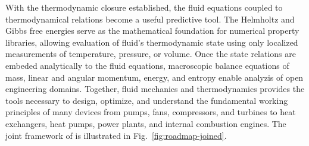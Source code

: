 With the thermodynamic closure established, the fluid equations coupled to thermodynamical relations become a useful predictive tool. The Helmholtz and Gibbs free energies serve as the mathematical foundation for numerical property libraries, allowing evaluation of fluid's thermodynamic state using only localized measurements of temperature, pressure, or volume. Once the state relations are embeded analytically to the fluid equations, macroscopic balance equations of mass, linear and angular momentum, energy, and entropy enable analyzis of open engineering domains. Together, fluid mechanics and thermodynamics provides the tools necessary to design, optimize, and understand the fundamental working principles of many devices from pumps, fans, compressors, and turbines to heat exchangers, heat pumps, power plants, and internal combustion engines. The joint framework of is illustrated in Fig.~\ref{fig:roadmap-joined}.

